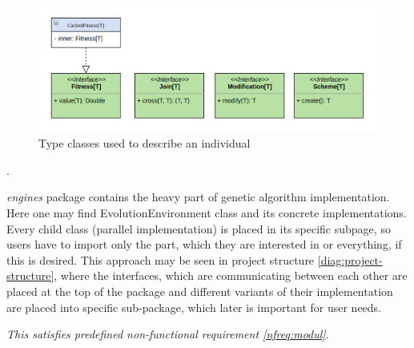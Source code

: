\begin{figure}[h]
\centering\includegraphics[width=1.\textwidth]{img/diagrams/alleles-genotype}
\caption{Type classes used to describe an individual}\label{diag:genotype-classes}
\end{figure}.

\textit{engines} package contains the heavy part of genetic algorithm implementation. Here one may find EvolutionEnvironment class and its concrete implementations. Every child class (parallel implementation) is placed in its specific subpage, so users have to import only the part, which they are interested in or everything, if this is desired. This approach may be seen in project structure \ref{diag:project-structure}, where the interfaces, which are communicating between each other are placed at the top of the package and different variants of their implementation are placed into specific sub-package, which later is important for user needs.

\smallskip\textit{This satisfies predefined non-functional requirement \ref{nfreq:modul}}.

